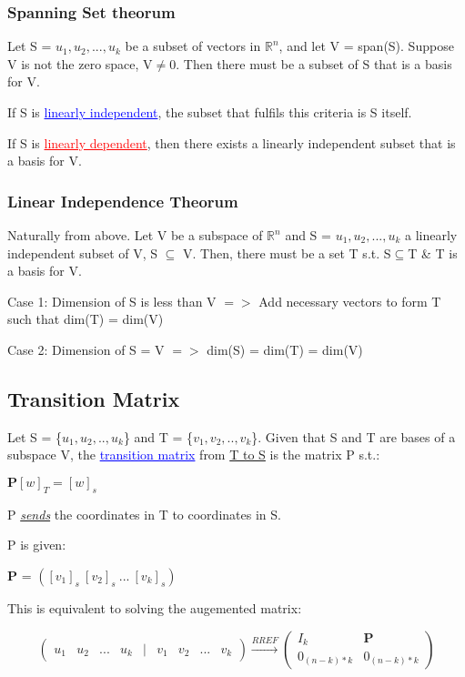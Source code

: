 \documentclass{article}
\newcommand{\bul}[1]{\textcolor{blue}{\underline{#1}}}
\newcommand{\rul}[1]{\textcolor{red}{\underline{#1}}}
\newcommand{\sbreak}{\vspace{10pt}}
\begin{document}
\subsubsection{Spanning Set theorum}
Let S = {$u_1, u_2,..., u_k$} be a subset of vectors in $\mathbb{R}^n$, and let V = span(S). Suppose V is not the zero space, V$\neq${0}. Then there must be a subset of S that is a basis for V.

\sbreak

If S is \bul{linearly independent}, the subset that fulfils this criteria is S itself.

If S is \rul{linearly dependent}, then there exists a linearly independent subset that is a basis for V.

\subsubsection{Linear Independence Theorum}
Naturally from above. Let V be a subspace of $\mathbb{R}^n$ and S = {$u_1,u_2,...,u_k$} a linearly independent subset of V, S $\subseteq$ V. Then, there must be a set T s.t. S$\subseteq$T \& T is a basis for V.

\sbreak

Case 1: Dimension of S is less than V $=>$ Add necessary vectors to form T such that dim(T) = dim(V)

Case 2: Dimension of S = V $=>$ dim(S) = dim(T) = dim(V)

\subsection{Transition Matrix}
Let S = \{$u_1, u_2,..,u_k$\} and T = \{$v_1,v_2,..,v_k$\}. Given that S and T are bases of a subspace V, the \bul{transition matrix} from \underline{T to S} is the matrix P s.t.:
\begin{center}
    $\mathbf{P}[w]_T = [w]_s$
\end{center}
P \textit{\underline{sends}} the coordinates in T to coordinates in S.

P is given:
\begin{center}
    \textbf{P} = $([v_1]_s\ [v_2]_s\ ...\ [v_k]_s)$
\end{center}

\sbreak

This is equivalent to solving the augemented matrix:
\begin{center}
    \[
    \begin{pmatrix}
        u_1 & u_2 & ... & u_k & \mid & v_1 & v_2 & ... & v_k
    \end{pmatrix}
    \xrightarrow{RREF}
    \begin{pmatrix}
        I_k & \textbf{P} \\
        0_{(n-k)*k} & 0_{(n-k)*k}
    \end{pmatrix}
    \]
\end{center}
\end{document}
